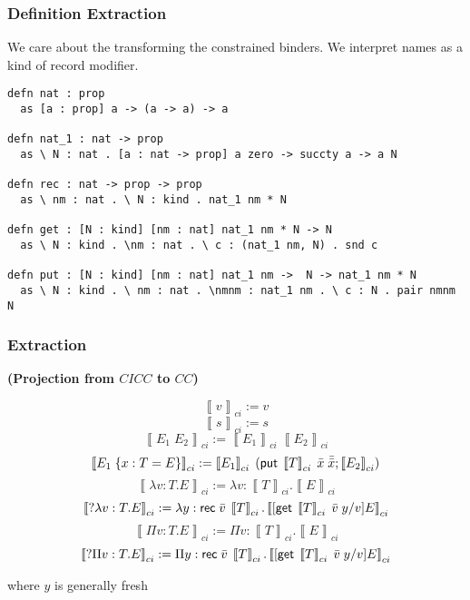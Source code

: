 
\begin{frame}[fragile]
\frametitle{Definition Extraction}
We care about the transforming the constrained binders.
We interpret names as a kind of record modifier.
\begin{lstlisting}
defn nat : prop 
  as [a : prop] a -> (a -> a) -> a

defn nat_1 : nat -> prop
  as \ N : nat . [a : nat -> prop] a zero -> succty a -> a N

defn rec : nat -> prop -> prop
  as \ nm : nat . \ N : kind . nat_1 nm * N

defn get : [N : kind] [nm : nat] nat_1 nm * N -> N
  as \ N : kind . \nm : nat . \ c : (nat_1 nm, N) . snd c

defn put : [N : kind] [nm : nat] nat_1 nm ->  N -> nat_1 nm * N
  as \ N : kind . \ nm : nat . \nmnm : nat_1 nm . \ c : N . pair nmnm N
\end{lstlisting}
\end{frame}



\newcommand{\CICCproj}[1]{ \left\llbracket #1 \right\rrbracket_{ci}}

\begin{frame}
\frametitle{Extraction}

\begin{definition}

\textbf{ (Projection from $CICC$ to $CC$) }

\[
\CICCproj{v} := v
\]\[
\CICCproj{s} := s
\]\[
\CICCproj{E_1 \; E_2} := \CICCproj{E_1} \; \CICCproj{E_2}
\]\[
\CICCproj{E_1 \; \{ x : T = E \}} := \CICCproj{E_1} \; (\m{put}\;\CICCproj{T}\;\bar{x}\; \bar{\bar{x}}; \CICCproj{E_2} )
\]\[
\CICCproj{\lambda v : T . E } := \lambda v : \CICCproj{T} . \CICCproj{E}
\]\[
\CICCproj{?\lambda v : T . E } := \lambda y : \m{rec}\;\bar{v}\; \CICCproj{T} . \CICCproj{ [ \m{get}\; \CICCproj{T}\; \bar{v}\; y  / v ] E}
\]\[
\CICCproj{\Pi v : T . E } := \Pi v : \CICCproj{T} . \CICCproj{E}
\]\[
\CICCproj{?\Pi v : T . E } := \Pi y : \m{rec}\;\bar{v}\;\CICCproj{T} . \CICCproj{ [ \m{get}\;\CICCproj{T}\; \bar{v}\; y  / v ] E}
\]

where $y$ is generally fresh
\end{definition}
\end{frame}



